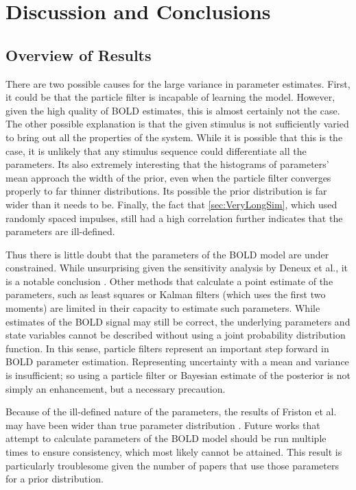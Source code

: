 \chapter{Discussion and Conclusions}
\label{sec:Discussion}
\section{Overview of Results}
There are two possible causes for the large variance in
parameter estimates. First, it could be that the particle filter is
incapable of learning the model. However, given the high quality
of BOLD estimates, this is almost certainly not the case. The other
possible explanation is that the given stimulus is not sufficiently
varied to bring out all the properties of the system. While it is
possible that this is the case, it is unlikely that any
stimulus sequence could differentiate all the parameters.
Its also extremely interesting that the histograms of parameters' mean
approach the width of the prior, even when the particle filter converges
properly to far thinner distributions. Its possible the prior
distribution is far wider than
it needs to be. Finally, the fact that \autoref{sec:VeryLongSim}, which
used randomly spaced impulses,
still had a high correlation further indicates that the parameters
are ill-defined.

Thus there is little doubt that the parameters of the BOLD model are under
constrained. While unsurprising given the sensitivity analysis by Deneux et al.,
it is a notable conclusion \cite{Deneux2006}. Other methods
that calculate a point estimate of the parameters, such as least squares
or Kalman filters (which uses the first two moments) are limited in their
capacity to estimate such parameters. While estimates of
the  BOLD signal may still be correct, the
underlying parameters and state variables cannot be described without using
a joint probability distribution function. In this sense, particle
filters represent an important step forward in BOLD parameter
estimation. Representing uncertainty with a mean
and variance is insufficient; so using a particle filter
or Bayesian estimate of the posterior is not simply an enhancement,
but a necessary precaution.

Because of the ill-defined nature of the parameters, the results
of Friston et al. may have been wider than true parameter distribution
\cite{Friston2002}. Future works that attempt to calculate parameters
of the BOLD model should be run multiple times to ensure consistency,
which most likely cannot be attained. This result is particularly
troublesome given the number of papers that use those parameters for
a prior distribution.

